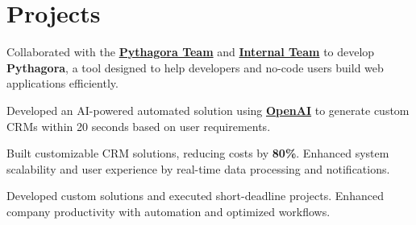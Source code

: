 \documentclass[]{deedy-resume-openfont}
\begin{document}
\begin{minipage}[t]{0.66\textwidth}

    \section{Projects}
    \vspace{0.5em}

    \vspace{0.2em}

    Collaborated with the \textbf{\href{https://pythagora.ai/}{Pythagora Team}} and \textbf{\href{https://www.lnwebworks.com/}{Internal Team}} to develop \textbf{Pythagora}, a tool designed to help developers and no-code users build web applications efficiently.
    \sectionsep

    \vspace{0.2em}  

    Developed an AI-powered automated solution using \textbf{\href{http://openai.com/}{OpenAI}} to generate custom CRMs within 20 seconds based on user requirements.  
    \sectionsep  

    \vspace{0.2em}  

    Built customizable CRM solutions, reducing costs by \textbf{80\%}.  
    Enhanced system scalability and user experience by real-time data processing and notifications.   
    \sectionsep  


    Developed custom solutions and executed short-deadline projects.  
    Enhanced company productivity with automation and optimized workflows.  
    \sectionsep  





\end{minipage}
\end{document}
